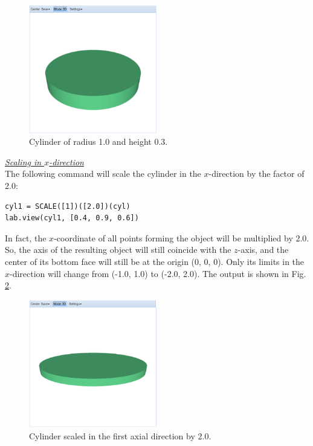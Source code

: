 \documentclass[article,A4,12pt]{llncs}
\begin{document}
\newpage

\begin{figure}[!ht]
\begin{center}
\includegraphics[width=0.5\textwidth]{img/scale-0.png}
\end{center}
\vspace{-2mm}
\caption{Cylinder of radius 1.0 and height 0.3.}
\label{fig:scale-0}
\end{figure}

\noindent
\underline{\em Scaling in $x$-direction}\\

The following command will 
scale the cylinder in the $x$-direction by the factor of 2.0: 

\begin{verbatim}
cyl1 = SCALE([1])([2.0])(cyl)
lab.view(cyl1, [0.4, 0.9, 0.6])
\end{verbatim}
In fact, the $x$-coordinate of all points forming 
the object will be multiplied by 2.0. So, the axis of the resulting object will still
coincide with the $z$-axis, and the center of its bottom face will
still be at the origin (0, 0, 0). Only its limits in the $x$-direction will change 
from (-1.0, 1.0) to (-2.0, 2.0).
The output is shown in Fig. \ref{fig:scale-1}.

\newpage

\begin{figure}[!ht]
\begin{center}
\includegraphics[width=0.5\textwidth]{img/scale-1.png}
\end{center}
\vspace{-2mm}
\caption{Cylinder scaled in the first axial direction by 2.0.}
\label{fig:scale-1}
\end{figure}
\end{document}
